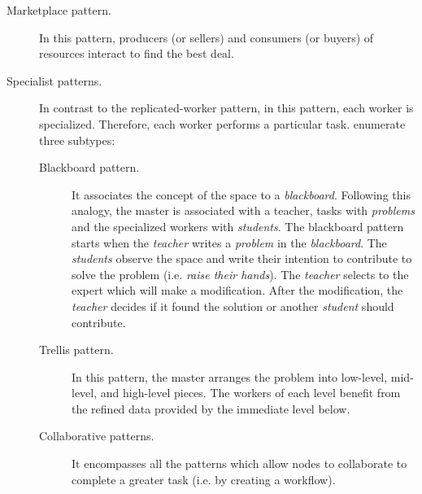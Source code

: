 \begin{description}
  \item[Marketplace pattern.] In this pattern, producers (or sellers) and consumers (or buyers) of resources interact to find the best deal. %
  \item[Specialist patterns.] In contrast to the replicated-worker pattern, in this pattern, each worker is specialized.
                              Therefore, each worker performs a particular task.
                              \citeauthor{freeman_javaspaces_1999} enumerate three subtypes:
			      \begin{description}
				  \item[Blackboard pattern.]
					It associates the concept of the space to a \emph{blackboard}.
					Following this analogy, the master is associated with a teacher, tasks with \emph{problems} and the specialized workers with \emph{students}.
					The blackboard pattern starts when the \emph{teacher} writes a \emph{problem} in the \emph{blackboard}.
					The \emph{students} observe the space and write their intention to contribute to solve the problem (i.e. \emph{raise their hands}).
					The \emph{teacher} selects to the expert which will make a modification.
					After the modification, the \emph{teacher} decides if it found the solution or another \emph{student} should contribute.
				  \item [Trellis pattern.]
					In this pattern, the master arranges the problem into low-level, mid-level, and high-level pieces.
					The workers of each level benefit from the refined data provided by the immediate level below.
				  \item [Collaborative patterns.]
					It encompasses all the patterns which allow nodes to collaborate to complete a greater task (i.e. by creating a workflow).
			      \end{description}
\end{description}


